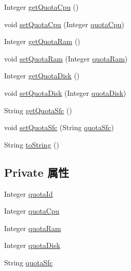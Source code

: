 \begin{DoxyCompactItemize}
\item 
Integer \mbox{\hyperlink{classcom_1_1example_1_1demo_1_1modular_1_1_quota_a2d7962db25e1afd51ffc7b0f1e9823a3}{get\+Quota\+Cpu}} ()
\item 
void \mbox{\hyperlink{classcom_1_1example_1_1demo_1_1modular_1_1_quota_ab8eb82e140a23a145ed95d0f6c7f9924}{set\+Quota\+Cpu}} (Integer \mbox{\hyperlink{classcom_1_1example_1_1demo_1_1modular_1_1_quota_a428b51538960a749a252ed4606f6fc07}{quota\+Cpu}})
\item 
Integer \mbox{\hyperlink{classcom_1_1example_1_1demo_1_1modular_1_1_quota_a38e5ef98be289ac3cc392b46fd1784a3}{get\+Quota\+Ram}} ()
\item 
void \mbox{\hyperlink{classcom_1_1example_1_1demo_1_1modular_1_1_quota_a55c73b027fee4fb6c65c91a87661a12b}{set\+Quota\+Ram}} (Integer \mbox{\hyperlink{classcom_1_1example_1_1demo_1_1modular_1_1_quota_a5e114f4238f35d989f3c462579f39428}{quota\+Ram}})
\item 
Integer \mbox{\hyperlink{classcom_1_1example_1_1demo_1_1modular_1_1_quota_a051d75b903ea31782bc3c791e0a75043}{get\+Quota\+Disk}} ()
\item 
void \mbox{\hyperlink{classcom_1_1example_1_1demo_1_1modular_1_1_quota_a3f87c257ea478133fc1469847992beb7}{set\+Quota\+Disk}} (Integer \mbox{\hyperlink{classcom_1_1example_1_1demo_1_1modular_1_1_quota_a9a8b2cad8d2a7bc029339bf2f0ad1922}{quota\+Disk}})
\item 
String \mbox{\hyperlink{classcom_1_1example_1_1demo_1_1modular_1_1_quota_aa836103ff5057ab9497caeea8e54eb0a}{get\+Quota\+Sfc}} ()
\item 
void \mbox{\hyperlink{classcom_1_1example_1_1demo_1_1modular_1_1_quota_a991f35fab901a3551a5a9f0ebe5e408e}{set\+Quota\+Sfc}} (String \mbox{\hyperlink{classcom_1_1example_1_1demo_1_1modular_1_1_quota_a63b24dc70969112269a9577fdd7dfb8e}{quota\+Sfc}})
\item 
String \mbox{\hyperlink{classcom_1_1example_1_1demo_1_1modular_1_1_quota_a5fb8790df547e14835de580997046b23}{to\+String}} ()
\end{DoxyCompactItemize}
\subsection*{Private 属性}
\begin{DoxyCompactItemize}
\item 
Integer \mbox{\hyperlink{classcom_1_1example_1_1demo_1_1modular_1_1_quota_a967956cd207b1a25008b8df8de611b20}{quota\+Id}}
\item 
Integer \mbox{\hyperlink{classcom_1_1example_1_1demo_1_1modular_1_1_quota_a428b51538960a749a252ed4606f6fc07}{quota\+Cpu}}
\item 
Integer \mbox{\hyperlink{classcom_1_1example_1_1demo_1_1modular_1_1_quota_a5e114f4238f35d989f3c462579f39428}{quota\+Ram}}
\item 
Integer \mbox{\hyperlink{classcom_1_1example_1_1demo_1_1modular_1_1_quota_a9a8b2cad8d2a7bc029339bf2f0ad1922}{quota\+Disk}}
\item 
String \mbox{\hyperlink{classcom_1_1example_1_1demo_1_1modular_1_1_quota_a63b24dc70969112269a9577fdd7dfb8e}{quota\+Sfc}}
\end{DoxyCompactItemize}


